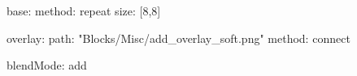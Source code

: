 base:
  method: repeat
  size: [8,8]

overlay:
  path: "Blocks/Misc/add_overlay_soft.png"
  method: connect

blendMode: add